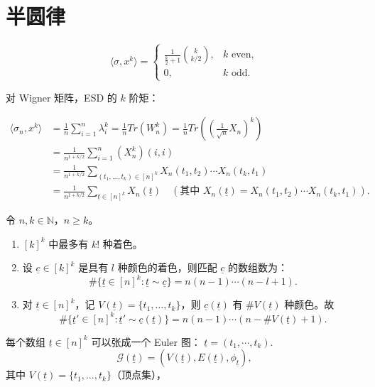 \section{半圆律}


\[
\langle \sigma, x^k \rangle = 
\begin{cases} 
\frac{1}{\frac{k}{2}+1} \binom{k}{k/2}, & k \text{ even}, \\
0, & k \text{ odd}.
\end{cases}
\]

对 Wigner 矩阵，ESD 的 $k$ 阶矩：

\begin{equation*}
    \begin{aligned}
        \langle \sigma_n, x^k \rangle& = \frac{1}{n} \sum_{i=1}^n \lambda_i^k = \frac{1}{n} Tr(W_n^k) = \frac{1}{n} Tr\left( \left( \frac{1}{\sqrt{n}} X_n \right)^k \right)\\
        &=\frac{1}{n^{1 + k/2}} \sum_{i=1}^n (X_n^k)(i,i) \\
        &=\frac{1}{n^{1 + k/2}} \sum_{(t_1, \ldots, t_k) \in [n]^k} X_n(t_1, t_2) \cdots X_n(t_k, t_1)\\
        &= \frac{1}{n^{1 + k/2}} \sum_{\underline{t} \in [n]^k} X_n(\underline{t}) \quad (\text{其中 } X_n(\underline{t}) = X_n(t_1,t_2)\cdots X_n(t_k,t_1)).
    \end{aligned}
\end{equation*}

\begin{lemma}
令 $n,k \in \mathbb{N}$，$n \ge k$。
\begin{enumerate}
\item $[k]^k$ 中最多有 $k!$ 种着色。
\item 设 $\underline{c} \in [k]^k$ 是具有 $l$ 种颜色的着色，则匹配 $\underline{c} $ 的数组数为：
\[
\#\{ \underline{t}  \in [n]^k : \underline{t}  \sim \underline{c}  \} = n(n-1)\cdots(n-l+1).
\]
\item 对 $\underline{t}  \in [n]^k$，记 $V(\underline{t} ) = \{t_1, \ldots, t_k\}$，则 $\underline{c} (\underline{t} )$ 有 $\#V(\underline{t} )$ 种颜色。故
\[
\#\{ \underline{t} ' \in [n]^k :\underline{t} '\sim \underline{c} (\underline{t} ) \} = n(n-1)\cdots(n - \#V(\underline{t} ) + 1).
\]
\end{enumerate}
\end{lemma}

每个数组 $\underline{t} \in [n]^k$ 可以张成一个 Euler 图：
$\underline{t}=(t_1,\cdots,t_k)$.
\[
\mathcal{G}(\underline{t}) = (V(\underline{t}), E(\underline{t}), \phi_{\underline{t}} ),
\]
其中 $V(\underline{t}) = \{t_1, \ldots, t_k\}$（顶点集），

